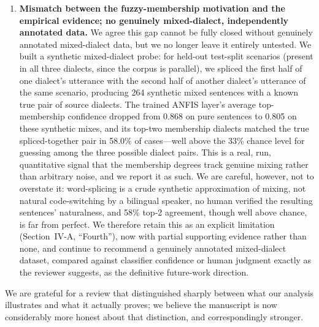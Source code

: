 \documentclass[11pt]{article}
\begin{document}
\begin{enumerate}
\item \textbf{Mismatch between the fuzzy-membership motivation and the empirical evidence; no genuinely mixed-dialect, independently annotated data.} We agree this gap cannot be fully closed without genuinely annotated mixed-dialect data, but we no longer leave it entirely untested. We built a synthetic mixed-dialect probe: for held-out test-split scenarios (present in all three dialects, since the corpus is parallel), we spliced the first half of one dialect's utterance with the second half of another dialect's utterance of the same scenario, producing 264 synthetic mixed sentences with a known true pair of source dialects. The trained ANFIS layer's average top-membership confidence dropped from 0.868 on pure sentences to 0.805 on these synthetic mixes, and its top-two membership dialects matched the true spliced-together pair in 58.0\% of cases---well above the 33\% chance level for guessing among the three possible dialect pairs. This is a real, run, quantitative signal that the membership degrees track genuine mixing rather than arbitrary noise, and we report it as such. We are careful, however, not to overstate it: word-splicing is a crude synthetic approximation of mixing, not natural code-switching by a bilingual speaker, no human verified the resulting sentences' naturalness, and 58\% top-2 agreement, though well above chance, is far from perfect. We therefore retain this as an explicit limitation (Section~IV-A, ``Fourth''), now with partial supporting evidence rather than none, and continue to recommend a genuinely annotated mixed-dialect dataset, compared against classifier confidence or human judgment exactly as the reviewer suggests, as the definitive future-work direction.
\end{enumerate}

We are grateful for a review that distinguished sharply between what our analysis illustrates and what it actually proves; we believe the manuscript is now considerably more honest about that distinction, and correspondingly stronger.
\end{document}
